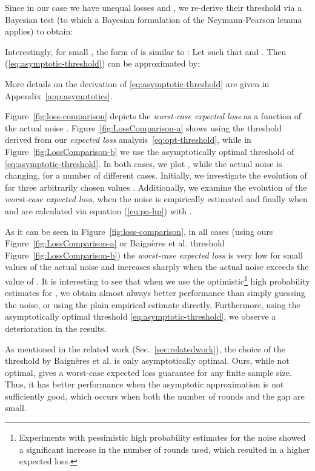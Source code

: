 \documentclass[a4paper]{article}
\theoremstyle{plain} \newtheorem{remark}{Remark}
\theoremstyle{plain} \newtheorem{definition}{Definition}
\theoremstyle{plain} \newtheorem{example}{Example}
\theoremstyle{plain} \newtheorem{assumption}{Assumption}
\theoremstyle{plain} \newtheorem{conjecture}{Conjecture}
\theoremstyle{plain} \newtheorem{theorem}{Theorem}
\theoremstyle{plain} \newtheorem{proposition}{Proposition}
\theoremstyle{plain} \newtheorem{lemma}{Lemma}
\theoremstyle{plain} \newtheorem{corollary}{Corollary}
\begin{document}
Since in our case we have unequal losses  and , we
re-derive their threshold via a Bayesian test (to which a Bayesian
formulation of the Neymann-Pearson
lemma~\cite{Degroot:OptimalStatisticalDecisions} applies) to obtain:

Interestingly, for small , the form of  is
similar to : Let  such that 
and . Then (\ref{eq:asymptotic-threshold})
can be approximated by:

More details on the derivation of \eqref{eq:asymptotic-threshold} are
given in Appendix~\ref{app:asymptotics}.

Figure~\ref{fig:loss-comparison} depicts the \textit{worst-case
  expected loss}  as a function of the actual noise .
Figure~\ref{fig:LossComparison-a} shows  using the threshold
 derived from our {\em expected loss}
analysis~\eqref{eq:opt-threshold}, while in
Figure~\ref{fig:LossComparison-b} we use the asymptotically optimal
threshold of \eqref{eq:asymptotic-threshold}. In both cases, we plot
, while the actual noise  is changing, for a number of
different cases. Initially, we investigate the evolution of 
for three arbitrarily chosen values . Additionally, we examine the evolution of the
{\em worst-case expected loss}, when the noise is empirically
estimated  and finally when  and
 are calculated via equation (\ref{eq:pa-hp}) with .




As it can be seen in Figure~\ref{fig:loss-comparison}, in all cases
(using ours Figure~\ref{fig:LossComparison-a} or Baign\`{e}res et
al. \cite{ProvSec2010} threshold Figure~\ref{fig:LossComparison-b})
the \textit{worst-case expected loss} is very low for small values of
the actual noise and increases sharply when the actual noise exceeds
the value of . It is interesting to see that when we use the
optimistic\footnote{Experiments with pessimistic high probability
  estimates for the noise showed a significant increase in the number
  of rounds used, which resulted in a higher expected loss.}
high probability estimates for , we obtain almost always
better performance than simply guessing the noise, or using the plain
empirical estimate  directly. Furthermore, using the
asymptotically optimal threshold \eqref{eq:asymptotic-threshold}, we
observe a deterioration in the results.



As mentioned in the related work (Sec.~\ref{sec:relatedwork}), the
choice of the threshold by Baign\`{e}res et al. \cite{ProvSec2010} is
only asymptotically optimal. Ours, while not optimal, gives a
worst-case expected loss guarantee for any finite sample size. Thus,
it has better performance when the asymptotic approximation is not
sufficiently good, which occurs when both the number of rounds  and
the gap  are small.
\end{document}

